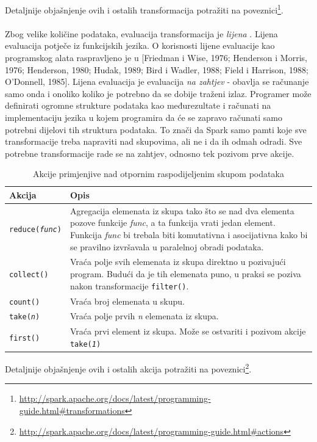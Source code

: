 \documentclass[times, utf8, zavrsni, numeric]{fer}
\begin{document}
Detaljnije objašnjenje ovih i ostalih transformacija potražiti na poveznici\footnote{\url{http://spark.apache.org/docs/latest/programming-guide.html#transformations}}.
\\
\\
Zbog velike količine podataka, evaluacija transformacija je \emph{lijena} . Lijena evaluacija potječe iz funkcijskih jezika. O korisnosti lijene evaluacije kao programskog alata raspravljeno je u [Friedman i Wise, 1976; Henderson i Morris, 1976; Henderson, 1980; Hudak, 1989; Bird i Wadler, 1988; Field i Harrison, 1988; O'Donnell, 1985]. Lijena evaluacija je evaluacija \emph{na zahtjev} - obavlja se računanje samo onda i onoliko koliko je potrebno da se dobije traženi izlaz. Programer može definirati ogromne strukture podataka kao međurezultate i računati na implementaciju jezika u kojem programira da će se zapravo računati samo potrebni dijelovi tih struktura podataka. To znači da Spark samo pamti koje sve transformacije treba napraviti nad skupovima, ali ne i da ih odmah odradi. Sve potrebne transformacije rade se na zahtjev, odnosno tek pozivom prve akcije. 

\vspace{5mm}
\begin{table}[htb]
\caption{Akcije primjenjive nad otpornim raspodijeljenim skupom podataka}
\label{tbl:akcije}
\centering
\begin{tabular}{lp{8cm}} 
\hline
Akcija & Opis \\
\hline
\texttt{reduce(\emph{func})} & Agregacija elemenata iz skupa tako što se nad dva elementa pozove funkcije \emph{func}, a ta funkcija vrati jedan element. Funkcija \emph{func} bi trebala biti komutativna i asocijativna kako bi se pravilno izvršavala u paralelnoj obradi podataka.\\
\texttt{collect()} & Vraća polje svih elemenata iz skupa direktno u pozivajući program. Budući da je tih elemenata puno, u praksi se poziva nakon transformacije \texttt{filter()}. \\
\texttt{count()} & Vraća broj elemenata u skupu. \\
\texttt{take(\emph{n})} & Vraća polje prvih \emph{n} elemenata iz skupa. \\
\texttt{first()} & Vraća prvi element iz skupa. Može se ostvariti i pozivom akcije \texttt{take(\emph{1})}\\
\hline
\end{tabular}
\end{table}
Detaljnije objašnjenje ovih i ostalih akcija potražiti na poveznici\footnote{\url{http://spark.apache.org/docs/latest/programming-guide.html#actions}}.
\\
\end{document}
